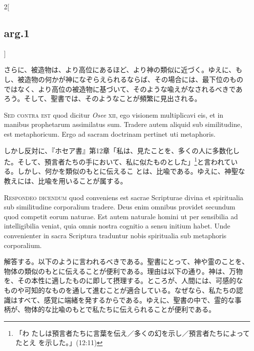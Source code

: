 \documentclass[
paper=a4paper,
fontsize=10pt,
jafontsize=9pt,
titlepage
]{jlreq}
\begin{document}
\begin{paracol}{2}[\subsection{arg.1}]
\switchcolumn

さらに、被造物は、より高位にあるほど、より神の類似に近づく。ゆえに、も
し、被造物の何かが神になぞらえられるならば、その場合には、最下位のもの
ではなく、より高位の被造物に基づいて、そのような喩えがなされるべきであ
ろう。そして、聖書では、そのようなことが頻繁に見出される。

\switchcolumn*[\subsection{s.c.}]

{\scshape Sed contra est} quod dicitur {\itshape Osee} {\scshape xii},
ego visionem multiplicavi eis, et in manibus prophetarum assimilatus
sum. Tradere autem aliquid sub similitudine, est metaphoricum. Ergo ad
sacram doctrinam pertinet uti metaphoris.

\switchcolumn

しかし反対に、『ホセア書』第12章「私は、見たことを、多くの人に多数化し
た。そして、預言者たちの手において、私に似たものとした」\footnote{「わ
たしは預言者たちに言葉を伝え／多くの幻を示し／預言者たちによってたとえ
を示した。」(12:11)}と言われている。しかし、何かを類似のもとに伝えるこ
とは、比喩である。ゆえに、神聖な教えには、比喩を用いることが属する。


{\scshape Respondeo dicendum} quod conveniens est sacrae Scripturae
divina et spiritualia sub similitudine corporalium tradere. Deus enim
omnibus providet secundum quod competit eorum naturae. Est autem
naturale homini ut per sensibilia ad intelligibilia veniat, quia omnis
nostra cognitio a sensu initium habet. Unde convenienter in sacra
Scriptura traduntur nobis spiritualia sub metaphoris corporalium.

\switchcolumn

解答する。以下のように言われるべきである。聖書にとって、神や霊のことを、
物体の類似のもとに伝えることが便利である。理由は以下の通り。神は、万物
を、その本性に適したものに即して摂理する。ところが、人間には、可感的な
ものや可知的なものを通して進むことが適合している。なぜなら、私たちの認
識はすべて、感覚に端緒を発するからである。ゆえに、聖書の中で、霊的な事
柄が、物体的な比喩のもとで私たちに伝えられることが便利である。

\switchcolumn*


\end{paracol}
\end{document}
